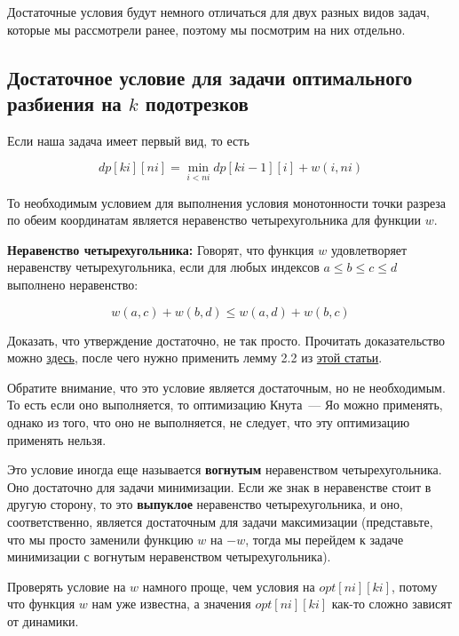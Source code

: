 Достаточные условия будут немного отличаться для двух разных видов задач, которые мы рассмотрели ранее, поэтому мы посмотрим на них отдельно.

\subsection{Достаточное условие для задачи оптимального разбиения на $k$ подотрезков}

Если наша задача имеет первый вид, то есть

$$dp[ki][ni] = \min_{i < ni} dp[ki - 1][i] + w(i, ni)$$

То необходимым условием для выполнения условия монотонности точки разреза по обеим координатам является неравенство четырехугольника для функции $w$.

\textbf{Неравенство четырехугольника:} Говорят, что функция $w$ удовлетворяет неравенству четырехугольника, если для любых индексов $a \le b \le c \le d$ выполнено неравенство:

$$w(a, c) + w(b, d) \le w(a, d) + w(b, c)$$

Доказать, что утверждение достаточно, не так просто. Прочитать доказательство можно \href{https://cse.hkust.edu.hk/mjg_lib/bibs/DPSu/DPSu.Files/sdarticle_204.pdf}{здесь}, после чего нужно применить лемму 2.2 из \href{https://cse.hkust.edu.hk/mjg_lib/bibs/DPSu/DPSu.Files/p429-yao.pdf}{этой статьи}.
    
\begin{observation}
Обратите внимание, что это условие является достаточным, но не необходимым. То есть если оно выполняется, то оптимизацию Кнута~--- Яо можно применять, однако из того, что оно не выполняется, не следует, что эту оптимизацию применять нельзя.
\end{observation}

\begin{observation}
    Это условие иногда еще называется \textbf{вогнутым} неравенством четырехугольника. Оно достаточно для задачи минимизации. Если же знак в неравенстве стоит в другую сторону, то это \textbf{выпуклое} неравенство четырехугольника, и оно, соответственно, является достаточным для задачи максимизации (представьте, что мы просто заменили функцию $w$ на $-w$, тогда мы перейдем к задаче минимизации с вогнутым неравенством четырехугольника).
\end{observation}

Проверять условие на $w$ намного проще, чем условия на $opt[ni][ki]$, потому что функция $w$ нам уже известна, а значения $opt[ni][ki]$ как-то сложно зависят от динамики.

